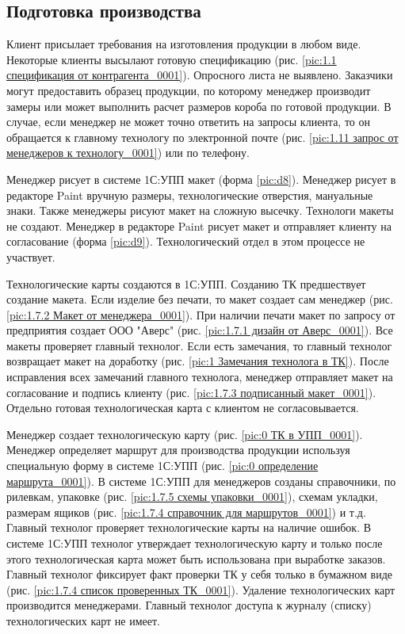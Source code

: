 \subsection{Подготовка производства}
\label{bp:Prepare}
%

Клиент присылает требования на изготовления продукции в любом виде. Некоторые клиенты высылают готовую спецификацию (рис. \ref{pic:1.1 спецификация от контрагента_0001}). Опросного листа не выявлено.
Заказчики могут предоставить образец продукции, по которому менеджер производит замеры  или может выполнить расчет размеров короба по готовой продукции. В случае, если менеджер не может точно ответить на запросы клиента, то он обращается к главному технологу по электронной почте (рис. \ref{pic:1.11 запрос от менеджеров к технологу_0001}) или по телефону. 

Менеджер рисует в системе 1С:УПП макет (форма \ref{pic:d8}).
 Менеджер рисует в редакторе Paint вручную размеры, технологические отверстия, мануальные знаки. Также менеджеры рисуют макет на сложную высечку.   Технологи макеты не создают.
 Менеджер в редакторе Paint рисует макет и отправляет клиенту на согласование (форма \ref{pic:d9}).  Технологический отдел в этом процессе не участвует.


Технологические карты создаются в 1С:УПП. Созданию ТК предшествует создание макета. Если изделие без печати, то макет создает сам менеджер (рис. \ref{pic:1.7.2 Макет от менеджера_0001}). При наличии печати макет по запросу от предприятия создает ООО "Аверс" (рис. \ref{pic:1.7.1 дизайн от Аверс_0001}). Все макеты проверяет главный технолог. Если есть замечания, то главный технолог возвращает макет на доработку (рис. \ref{pic:1 Замечания технолога в ТК}). После исправления всех замечаний главного технолога, менеджер отправляет макет на согласование и подпись клиенту (рис. \ref{pic:1.7.3 подписанный макет_0001}). Отдельно готовая технологическая карта с клиентом не согласовывается.

Менеджер создает технологическую карту (рис. \ref{pic:0 ТК в УПП_0001}). Менеджер определяет маршрут для производства продукции используя специальную форму в системе 1С:УПП (рис. \ref{pic:0 определение маршрута_0001}). В системе 1С:УПП для менеджеров созданы справочники, по рилевкам, упаковке (рис. \ref{pic:1.7.5 схемы упаковки_0001}), схемам укладки, размерам ящиков (рис. \ref{pic:1.7.4 справочник для маршрутов_0001}) и т.д.  Главный технолог проверяет технологические карты на наличие ошибок. В системе 1С:УПП технолог утверждает технологическую карту и только после этого технологическая карта может быть использована при выработке заказов. Главный технолог фиксирует факт проверки ТК у себя только в бумажном виде (рис. \ref{pic:1.7.4 список проверенных ТК_0001}).
Удаление технологических карт производится менеджерами. Главный технолог доступа к журналу (списку) технологических карт не имеет. 

